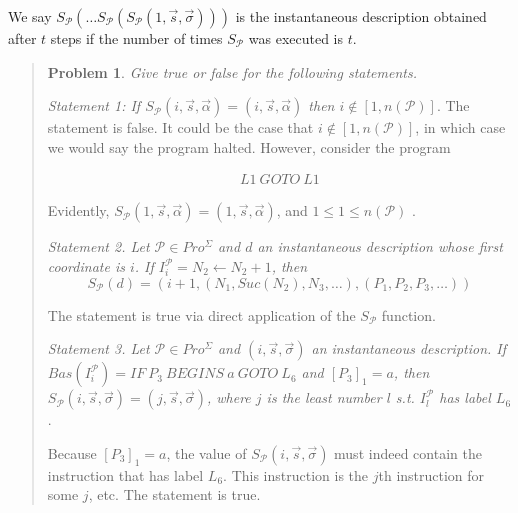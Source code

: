\documentclass[a4paper, 12pt]{article}
\newtheorem{problem}{Problem}
\newtheorem{problem}{Problem}
\begin{document}
We say $S_{\mathcal{P}} \left( \ldots S_{\mathcal{P}} \left(
S_{\mathcal{P}}\left( 1, \overrightarrow{s}, \overrightarrow{\sigma} \right)
\right)  \right) $ is the instantaneous description obtained after $t$ steps if
the number of times $S_{\mathcal{P}}$ was executed is $t$.


\small
\begin{quote}


\begin{problem}
    Give true or false for the following statements.
\end{problem}

\textit{Statement 1: If $S_{\mathcal{P}}(i, \overrightarrow{s},
\overrightarrow{\alpha}) = (i, \overrightarrow{s}, \overrightarrow{\alpha})$
then $i \not\in [1, n(\mathcal{P})]$}. The statement is false. It could be the
case that $i \not\in [1, n( \mathcal{P} )]$, in which case we would say the program
halted. However, consider the program 

\begin{align*}
    L1 ~ GOTO ~ L1 
\end{align*}

Evidently, $S_{\mathcal{P}}(1, \overrightarrow{s}, \overrightarrow{\alpha}) =
(1, \overrightarrow{s}, \overrightarrow{\alpha})$, and $1 \leq 1 \leq
n(\mathcal{P})$ .

\textit{Statement 2. Let $\mathcal{P} \in Pro^{\Sigma}$ and $d$ an instantaneous
description whose first coordinate is $i$. If $I_i^{\mathcal{P}} = N_2
\leftarrow N_2 + 1$, then $$S_{\mathcal{P}}(d) = \left( i+1, \left( N_1,
Suc(N_2), N_3, \ldots \right), (P_1, P_2, P_3, \ldots)  \right) $$}

The statement is true via direct application of the $S_{\mathcal{P}}$ function.

\textit{Statement 3. Let $\mathcal{P} \in Pro^{\Sigma}$ and $(i,
\overrightarrow{s}, \overrightarrow{\sigma})$ an instantaneous description. If
$Bas(I_i^{\mathcal{P}}) = IF ~ P_3 ~ BEGINS ~ a ~ GOTO ~ L_6$ and $[P_3]_1 = a$,
then $S_{\mathcal{P}}(i, \overrightarrow{s}, \overrightarrow{\sigma}) = (j,
\overrightarrow{s}, \overrightarrow{\sigma})$, where $j$ is the least number $l$
s.t. $I_{l}^{\mathcal{P}}$ has label $L_6$}.

Because $[P_3]_1 = a$, the value of $S_{\mathcal{P}}(i, \overrightarrow{s},
\overrightarrow{\sigma})$ must indeed contain the instruction that has label
$L_6$. This instruction is the $j$th instruction for some $j$, etc. The
statement is true.

\end{quote}
\normalsize
\end{document}
